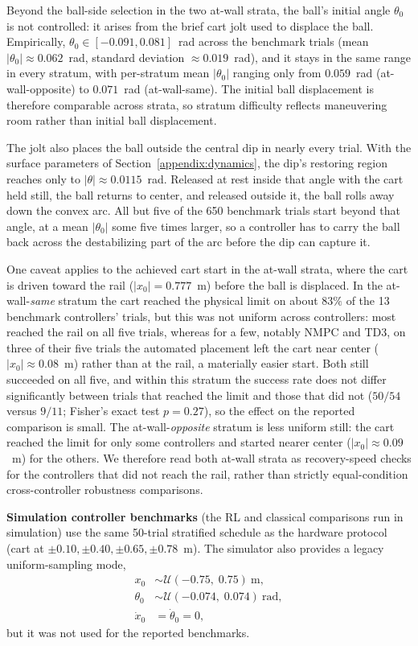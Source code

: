 Beyond the ball-side selection in the two at-wall strata, the ball's
initial angle $\theta_0$ is not controlled: it arises from
the brief cart jolt used to displace the ball. Empirically,
$\theta_0 \in [-0.091, 0.081]$~rad across the benchmark trials
(mean $|\theta_0| \approx 0.062$~rad, standard deviation $\approx 0.019$~rad),
and it stays in the same range in every stratum, with per-stratum mean
$|\theta_0|$ ranging only from $0.059$~rad (at-wall-opposite) to $0.071$~rad
(at-wall-same). The initial ball displacement is therefore comparable across
strata, so stratum difficulty reflects maneuvering room rather than initial
ball displacement.

The jolt also places the ball outside the central dip in nearly every trial.
With the surface parameters of Section~\ref{appendix:dynamics}, the dip's
restoring region reaches only to $|\theta| \approx 0.0115$~rad. Released at rest
inside that angle with the cart held still, the ball returns to center, and
released outside it, the ball rolls away down the convex arc. All but five of the 650 benchmark trials start beyond that angle, at a
mean $|\theta_0|$ some five times larger, so a controller has to carry the ball
back across the destabilizing part of the arc before the dip can capture it.

One caveat applies to the achieved cart start in the at-wall strata, where the
cart is driven toward the rail ($|x_0| = 0.777$~m) before the ball is displaced.
In the at-wall-\emph{same} stratum the cart reached the physical limit on about
$83\%$ of the 13 benchmark controllers' trials, but this was not uniform across
controllers: most reached the rail on all five trials, whereas for a few,
notably NMPC and TD3, on three of their five trials the automated placement
left the cart near center ($|x_0| \approx 0.08$~m) rather than at the rail, a
materially easier start. Both still succeeded on all five, and within this stratum the
success rate does not differ significantly between trials that reached the limit
and those that did not ($50/54$ versus $9/11$; Fisher's exact test $p = 0.27$),
so the effect on the reported comparison is small. The at-wall-\emph{opposite}
stratum is less uniform still: the cart reached the limit for only some
controllers and started nearer center ($|x_0| \approx 0.09$~m) for the others.
We therefore read both at-wall strata as recovery-speed checks for the
controllers that did not reach the rail, rather than strictly equal-condition
cross-controller robustness comparisons.

\textbf{Simulation controller benchmarks} (the RL and classical
comparisons run in simulation) use the same 50-trial stratified schedule
as the hardware protocol (cart at
$\pm 0.10, \pm 0.40, \pm 0.65, \pm 0.78$~m). The simulator also provides a
legacy uniform-sampling mode,
\begin{align}
  x_0 &\sim \mathcal{U}(-0.75,\;0.75)~\text{m}, \nonumber\\
  \theta_0 &\sim \mathcal{U}(-0.074,\;0.074)~\text{rad}, \nonumber\\
  \dot{x}_0 &= \dot{\theta}_0 = 0,
\end{align}
but it was not used for the reported benchmarks.

